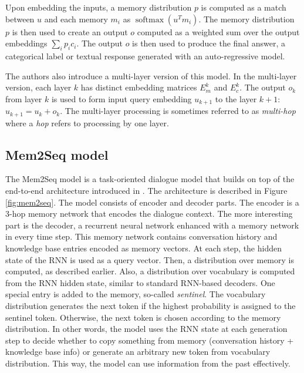 Upon embedding the inputs, a memory distribution $p$ is computed as a match between $u$ and each memory $m_i$ as $\operatorname{softmax} (u^Tm_i)$.
The memory distribution $p$ is then used to create an output $o$ computed as a weighted sum over the output embeddings $\sum_i p_ic_i$.
The output $o$ is then used to produce the final answer, a categorical label or textual response generated with an auto-regressive model.

The authors also introduce a multi-layer version of this model.
In the multi-layer version, each layer $k$ has distinct embedding matrices $E^k_m$ and $E^k_c$. The output $o_k$ from layer $k$ is used to form input query embedding $u_{k+1}$ to the layer $k+1$: $u_{k+1} = u_k + o_k$.
The multi-layer processing is sometimes referred to as \emph{multi-hop} where a \emph{hop} refers to processing by one layer.

\subsection{Mem2Seq model}
\label{02:sec:mem2seq}
The Mem2Seq model \cite{madotto-etal-2018-mem2seq} is a task-oriented dialogue model that builds on top of the end-to-end architecture introduced in \citet{sukhbaatar2015end}.
The architecture is described in Figure \ref{fig:mem2seq}.
The model consists of encoder and decoder parts.
The encoder is a 3-hop memory network that encodes the dialogue context.
The more interesting part is the decoder, a recurrent neural network enhanced with a memory network in every time step.
This memory network contains conversation history and knowledge base entries encoded as memory vectors.
At each step, the hidden state of the RNN is used as a query vector. Then, a distribution over memory is computed, as described earlier. 
Also, a distribution over vocabulary is computed from the RNN hidden state, similar to standard RNN-based decoders.
One special entry is added to the memory, so-called \emph{sentinel}.
The vocabulary distribution generates the next token if the highest probability is assigned to the sentinel token.
Otherwise, the next token is chosen according to the memory distribution.
In other words, the model uses the RNN state at each generation step to decide whether to copy something from memory (conversation history + knowledge base info) or generate an arbitrary new token from vocabulary distribution.
This way, the model can use information from the past effectively.

